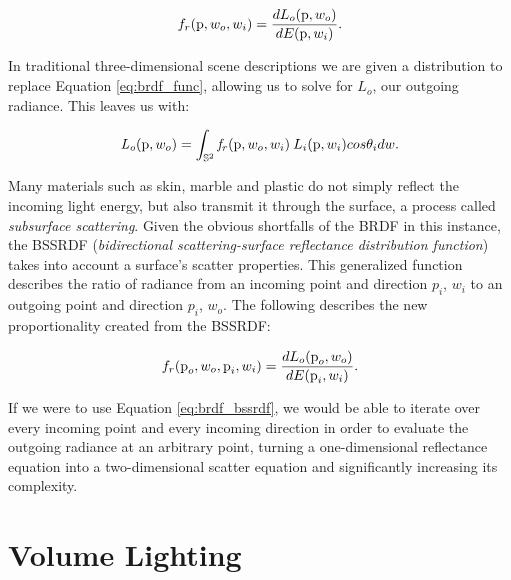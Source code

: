 \begin{equation}
f_r(\textup{p}, w_o, w_i) =  \frac{dL_o(\textup{p},w_o)}{dE(\textup{p},w_i)}.
\label{eq:brdf_func}
\end{equation}

In traditional three-dimensional scene descriptions we are given a distribution to replace Equation \ref{eq:brdf_func}, allowing us to solve for $L_o$, our outgoing radiance.  This leaves us with:

\begin{equation}
\mathit{L_o}(\textup{p}, w_o) = \int_{\mathbb{S}^2} \mathit{f_r}(\textup{p}, w_o, w_i)\:L_i(\textup{p}, w_i)cos\theta_i dw.
\label{eq:brdf_solve}
\end{equation}


Many materials such as skin, marble and plastic do not simply reflect the incoming light energy, but also transmit it through the surface, a process called \textit{subsurface scattering}.  Given the obvious shortfalls of the BRDF in this instance, the BSSRDF (\textit{bidirectional scattering-surface reflectance distribution function}) takes into account a surface's scatter properties.  This generalized function describes the ratio of radiance from an incoming point and direction $\textit{p}_{i}$, $w_{i}$ to an outgoing point and direction $\textit{p}_{i}$, $w_{o}$.  The following describes the new proportionality created from the BSSRDF:

\begin{equation}
f_r(\textup{p}_o, w_o, \textup{p}_i, w_i) =  \frac{dL_o(\textup{p}_o,w_o)}{dE(\textup{p}_i,w_i)}.
\label{eq:brdf_bssrdf}
\end{equation}

If we were to use Equation \ref{eq:brdf_bssrdf}, we would be able to iterate over every incoming point and every incoming direction in order to evaluate the outgoing radiance at an arbitrary point, turning a one-dimensional reflectance equation into a two-dimensional scatter equation and significantly increasing its complexity.

\section{Volume Lighting}

